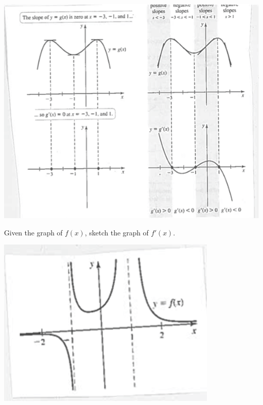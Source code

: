 \documentclass[cal1spr16Lectures.tex]{subfiles}
\begin{document}
\begin{frame}
\begin{center}
\includegraphics[scale=0.9]{pictures/Ch3Sect2new2}
\end{center}
\end{frame}

\begin{frame}
\begin{ex}
Given the graph of $f(x)$, sketch the graph of $f'(x)$.

\begin{center}
\includegraphics[scale=1]{pictures/Ch3Sect2new3}
\end{center}
\end{ex}
\end{frame}
\end{document}

